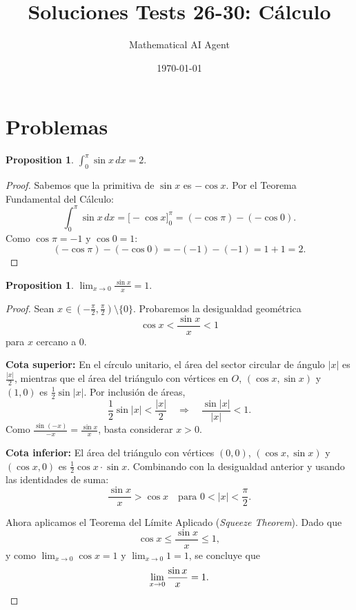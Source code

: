 \documentclass[11pt,a4paper]{article}
\title{Soluciones Tests 26-30: C\'alculo}
\author{Mathematical AI Agent}
\date{\today}
\theoremstyle{plain}
\newtheorem{proposition}[theorem]{Proposition}
\theoremstyle{definition}
\begin{document}
\maketitle
\section{Problemas}

\begin{proposition}\label{prop:26}
$\displaystyle\int_0^\pi \sin x \, dx = 2.$
\end{proposition}

\begin{proof}
Sabemos que la primitiva de $\sin x$ es $-\cos x$. Por el Teorema Fundamental del C\'alculo:
\[
\int_0^\pi \sin x \, dx = \bigl[-\cos x\bigr]_0^\pi = (-\cos \pi) - (-\cos 0).
\]
Como $\cos \pi = -1$ y $\cos 0 = 1$:
\[
(-\cos\pi) - (-\cos 0) = -(-1) - (-1) = 1 + 1 = 2.
\]
\end{proof}

\begin{proposition}\label{prop:27}
$\displaystyle\lim_{x \to 0} \frac{\sin x}{x} = 1.$
\end{proposition}

\begin{proof}
Sean $x \in \left(-\frac{\pi}{2}, \frac{\pi}{2}\right) \setminus \{0\}$.
Probaremos la desigualdad geom\'etrica
\[
\cos x < \frac{\sin x}{x} < 1
\]
para $x$ cercano a $0$.

\textbf{Cota superior:} En el c\'irculo unitario, el \'area del sector circular de \'angulo $|x|$ es $\frac{|x|}{2}$, mientras que el \'area del tri\'angulo con v\'ertices en $O$, $(\cos x, \sin x)$ y $(1,0)$ es $\frac{1}{2}\sin|x|$. Por inclusi\'on de \'areas,
\[
\frac{1}{2}\sin|x| < \frac{|x|}{2} \quad\Longrightarrow\quad \frac{\sin|x|}{|x|} < 1.
\]
Como $\frac{\sin(-x)}{-x} = \frac{\sin x}{x}$, basta considerar $x > 0$.

\textbf{Cota inferior:} El \'area del tri\'angulo con v\'ertices $(0,0)$, $(\cos x, \sin x)$ y $(\cos x, 0)$ es $\frac{1}{2}\cos x \cdot \sin x$. Combinando con la desigualdad anterior y usando las identidades de suma:
\[
\frac{\sin x}{x} > \cos x \quad \text{para } 0 < |x| < \frac{\pi}{2}.
\]

Ahora aplicamos el Teorema del L\'imite Aplicado (\emph{Squeeze Theorem}). Dado que
\[
\cos x \leq \frac{\sin x}{x} \leq 1,
\]
y como $\lim_{x\to 0}\cos x = 1$ y $\lim_{x\to 0} 1 = 1$, se concluye que
\[
\lim_{x \to 0} \frac{\sin x}{x} = 1. \qedhere
\]
\end{proof}
\end{document}

